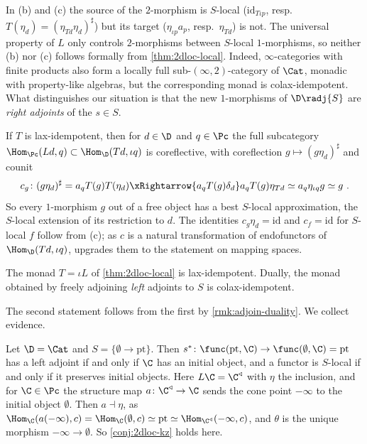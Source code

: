In (b) and (c) the source of the $2$-morphism is $S$-local ($\mathrm{id}_{T\iota p}$, resp.\ $T(\eta_{d}) = (\eta_{Td}\eta_{d})^{\sharp}$) but its target ($\eta_{\iota p}a_{p}$, resp.\ $\eta_{Td}$) is not. The universal property of $L$ only controls $2$-morphisms between $S$-local $1$-morphisms, so neither (b) nor (c) follows formally from \cref{thm:2dloc-local}. Indeed, $\infty$-categories with finite products also form a locally full sub-$(\infty,2)$-category of $\Cat$, monadic with property-like algebras, but the corresponding monad is colax-idempotent. What distinguishes our situation is that the new $1$-morphisms of $\D\radj{S}$ are \emph{right adjoints} of the $s \in S$.

\begin{rmk}
\label{rmk:kz-coreflection}
If $T$ is lax-idempotent, then for $d \in \D$ and $q \in \Pc$ the full subcategory $\Hom_{\Pc}(Ld,q) \subset \Hom_{\D}(Td,\iota q)$ is coreflective, with coreflection $g \mapsto (g\eta_{d})^{\sharp}$ and counit
\[
c_{g}\colon (g\eta_{d})^{\sharp} = a_{q}T(g)T(\eta_{d}) \xRightarrow{a_{q}T(g)\delta_{d}} a_{q}T(g)\eta_{Td} \simeq a_{q}\eta_{\iota q}g \simeq g \ .
\]
So every $1$-morphism $g$ out of a free object has a best $S$-local approximation, the $S$-local extension of its restriction to $d$. The identities $c_{g}\eta_{d} = \mathrm{id}$ and $c_{f} = \mathrm{id}$ for $S$-local $f$ follow from (c); as $c$ is a natural transformation of endofunctors of $\Hom_{\D}(Td,\iota q)$, \cite[5.2.2.8]{htt} upgrades them to the statement on mapping spaces.
\end{rmk}

\begin{conj}
\label{conj:2dloc-kz}
The monad $T = \iota L$ of \cref{thm:2dloc-local} is lax-idempotent. Dually, the monad obtained by freely adjoining \emph{left} adjoints to $S$ is colax-idempotent.
\end{conj}

The second statement follows from the first by \cref{rmk:adjoin-duality}. We collect evidence.

\begin{exmp}
\label{ex:kz-initial}
Let $\D = \Cat$ and $S = \{\emptyset \to \mathrm{pt}\}$. Then $s^{*}\colon \func(\mathrm{pt},\C) \to \func(\emptyset,\C) = \mathrm{pt}$ has a left adjoint if and only if $\C$ has an initial object, and a functor is $S$-local if and only if it preserves initial objects. Here $L\C = \C^{\triangleleft}$ with $\eta$ the inclusion, and for $\C \in \Pc$ the structure map $a\colon \C^{\triangleleft} \to \C$ sends the cone point $-\infty$ to the initial object $\emptyset$. Then $a \dashv \eta$, as $\Hom_{\C}(a(-\infty),c) = \Hom_{\C}(\emptyset,c) \simeq \mathrm{pt} \simeq \Hom_{\C^{\triangleleft}}(-\infty,c)$, and $\theta$ is the unique morphism $-\infty \to \emptyset$. So \cref{conj:2dloc-kz} holds here.
\end{exmp}

